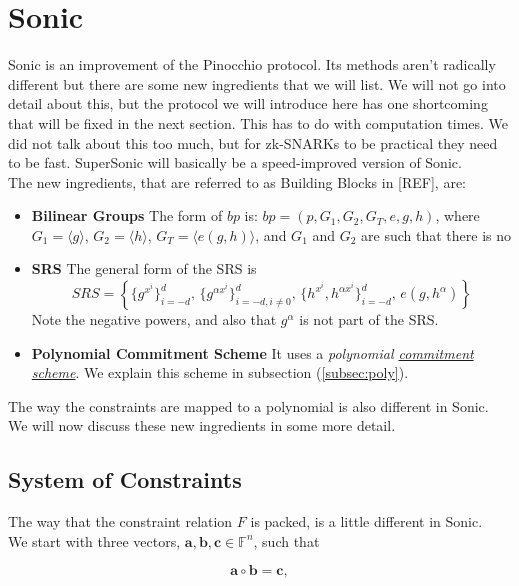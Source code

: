 \documentclass[11pt,oneside]{article}
\newcommand{\be}{\begin{equation}}
\newcommand{\ee}{\end{equation}}
\theoremstyle{definition}
\theoremstyle{remark}
\numberwithin{equation}{section}
\begin{document}
\section{Sonic }\label{sec:sonic}

Sonic is an improvement of the Pinocchio protocol. Its methods aren't radically
different but there are some new ingredients that we will list. We will not go
into detail about this, but the protocol we will introduce here has one
shortcoming that will be fixed in the next section. This has to do with
computation times. We did not talk about this too much, but for zk-SNARKs to be
practical they need to be fast. SuperSonic will basically be a speed-improved
version of Sonic.\\ The new ingredients, that are referred to as Building Blocks
in [REF], are:
\begin{itemize}
  \item \textbf{Bilinear Groups} The form of $bp$ is:
    $bp=\left(p,G_1,G_2,G_T,e,g,h \right)$, where $G_1=\langle g \rangle$,
    $G_2=\langle h \rangle$, $G_T=\langle e(g,h)\rangle$, and $G_1$ and $G_2$
    are such that there is no
  \item \textbf{SRS} The general form of the SRS is \[SRS=\left\{
    \{g^{x^i}\}_{i=-d}^{d},\,\{g^{\alpha x^i}\}_{i=-d,i\neq
0}^{d},\,\{h^{x^i},h^{\alpha x^i}\}_{i=-d}^{d},\, e(g,h^\alpha) \right\}\]
	Note the negative powers, and also that $g^\alpha$ is not part of the SRS.
  \item \textbf{Polynomial Commitment Scheme} It uses a \emph{polynomial
    \hyperlink{np:box}{commitment scheme}}. We explain this scheme in subsection
    (\ref{subsec:poly}).
\end{itemize}
The way the constraints are mapped to a polynomial is also different in Sonic.
We will now discuss these new ingredients in some more detail. 

\subsection{System of Constraints}
The way that the constraint relation $F$ is packed, is a little different in
Sonic. \\ \newline We start with three vectors,
$\mathbf{a},\mathbf{b},\mathbf{c}\in\mathbb{F}^n$, such that

\be\label{eq:mult}
\mathbf{a}\circ\mathbf{b}=\mathbf{c},
\ee
\end{document}
